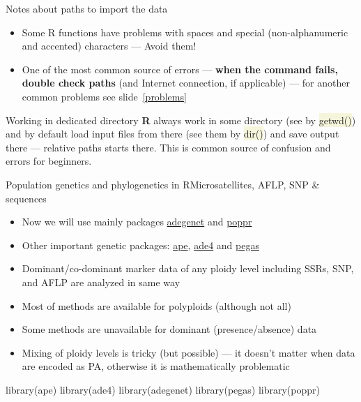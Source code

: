 \documentclass[compress, ucs, xelatex, 11pt, xcolor=svgnames, aspectratio=169,
	hyperref={
		bookmarks=true,
		unicode=true,
		colorlinks=true,
		pdftitle={Molecular data in R},
		plainpages=false,
		pdfauthor={Vojtech Zeisek},
		pdfsubject={Course about phylogeny and evolution in R},
		pdfcreator={XeLaTeX},
		pdfkeywords={R, evolution, phylogeny, molecular data},
		linkcolor=Crimson, %
		anchorcolor=Magenta, %
		citecolor=Magenta, %
		filecolor=Magenta, %
		menucolor=Magenta, %
		urlcolor=DodgerBlue, %
		pdftex},
	url={hyphens, lowtilde} %
	]{beamer}
\renewcommand{\texttt}[1]{\colorbox{Beige}{{\ttfamily #1}}}
\begin{document}
\begin{frame}[allowframebreaks]{Notes about paths to import the data}
\begin{itemize}
\begin{itemize}
		\end{itemize}
		\item Some R functions have problems with spaces and special (non-alphanumeric and accented) characters --- Avoid them!
		\item One of the most common source of errors --- \textbf{when the command fails, double check paths} (and Internet connection, if applicable) --- for another common problems see slide~\ref{problems}
	\end{itemize}
	\begin{alertblock}{Working in dedicated directory}
		\textbf{R} always work in some directory (see by \texttt{getwd()}) and by default load input files from there (see them by \texttt{dir()}) and save output there --- relative paths starts there. This is common source of confusion and errors for beginners.
	\end{alertblock}
\end{frame}

\begin{frame}[fragile]{Population genetics and phylogenetics in R}{Microsatellites, AFLP, SNP \& sequences}
	\begin{multicols}{2}
		\begin{itemize}
			\item Now we will use mainly packages \href{https://adegenet.r-forge.r-project.org/}{adegenet} and \href{https://grunwaldlab.github.io/poppr/}{poppr}
			\item Other important genetic packages: \href{http://ape-package.ird.fr/}{ape}, \href{https://pbil.univ-lyon1.fr/ADE-4/}{ade4} and \href{http://ape-package.ird.fr/pegas.html}{pegas}
			\item Dominant/co-dominant marker data of any ploidy level including SSRs, SNP, and AFLP are analyzed in same way
			\item Most of methods are available for polyploids (although not all)
			\item Some methods are unavailable for dominant (presence/absence) data
			\item Mixing of ploidy levels is tricky (but possible) --- it doesn't matter when data are encoded as PA, otherwise it is mathematically problematic
		\end{itemize}
		\begin{spluscode}
    library(ape)
    library(ade4)
    library(adegenet)
    library(pegas)
    library(poppr)
		\end{spluscode}
	\end{multicols}
\end{frame}
\end{document}
